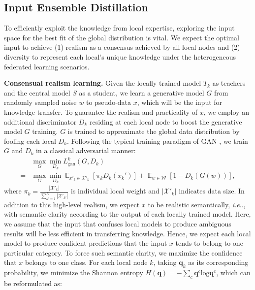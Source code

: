 \documentclass[letterpaper]{article} %
\makeatletter
\DeclareRobustCommand\onedot{\futurelet\@let@token\@onedot}
\def\@onedot{\ifx\@let@token.\else.\null\fi\xspace}
\DeclareMathOperator*{\fe}{\mathbb{E}}
\def\ie{\emph{i.e}\onedot} \def\Ie{\emph{I.e}\onedot}
\newcommand{\domw}{\mathcal{W}}
\newcommand{\domx}{\mathcal{X}}
\makeatother
\begin{document}
\subsection{Input Ensemble Distillation}
 To efficiently exploit the knowledge from local expertise, exploring the input space for the best fit of the global distribution is vital. We expect the optimal input to achieve (1) realism as a consensus achieved by all local nodes and (2) diversity to represent each local's unique knowledge under the heterogeneous federated learning scenarios.

\textbf{Consensual realism learning.}
Given the locally trained model $T_k$ as teachers and the central model $S$ as a student, we learn a generative model $G$ from randomly sampled noise $w$ to pseudo-data $x$, which will be the input for knowledge transfer. To guarantee the realism and practicality of $x$, we employ an additional discriminator $D_k$ residing at each local node to boost the generative model $G$ training.  $G$ is trained to approximate the global data distribution by fooling each local $D_k$. Following the typical training paradigm of GAN \cite{goodfellow2020generative, radford2015unsupervised}, we train $G$ and $D_k$ in a classical adversarial manner:
\begin{equation}
\label{eq:ganloss}
\begin{aligned}
    &\max_G \min_{D_k}L_\text{gan}^k(G, D_k) \\
    = &\max_G \min_{D_k} \fe_{x'_k \in \domx'_k} [\pi_k D_k(x_k')]  +  \fe_{w \in \domw} [1-D_k(G(w))],
\end{aligned}
\end{equation}
where $\pi_k =  \frac{|\domx'_k|}{\sum_{k'=1}^K |\domx'_{k'}|}$ is individual local weight and $|\domx'_k|$ indicates data size. In addition to this high-level realism, we expect $x$ to be realistic semantically, \ie, with semantic clarity according to the output of each locally trained model. Here, we assume that the input that confuses local models to produce ambiguous results will be less efficient in transferring knowledge. Hence, we expect each local model to produce confident predictions that the input $x$ tends to belong to one particular category. To force such semantic clarity, we maximize the confidence that $x$ belongs to one class. For each local node $k$, taking $\bm{q}_k$ as its corresponding probability, we minimize the Shannon entropy $H({\bm{q}})= - \sum_c \bm{q}^c \text{log} \bm{q}^c $, which can be reformulated as: 
\end{document}
